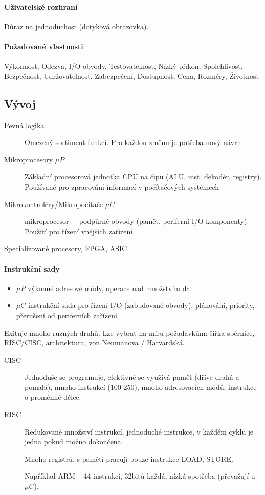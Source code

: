 \documentclass[a4paper, 11pt]{report}
\begin{document}
\paragraph{Uživatelské rozhraní}
Důraz na jednoduchost (dotyková obrazovka).

\paragraph{Požadované vlastnosti}
Výkonnost,  Odezva,  I/O obvody,  Testovatelnost,  Nízký příkon,  Spolehlivost,  Bezpečnost,  Udržovatelnost,  Zabezpečení,  Dostupnost,  Cena,  Rozměry,  Životnost

\subsection{Vývoj}
\begin{description}
	\item[Pevná logika] Omezený sortiment funkcí. Pro každou změnu je potřeba nový návrh
	\item[Mikroprocesory $\mu P$] Základní procesorová jednotka CPU na čipu (ALU, inst. dekodér, registry). Používané pro zpracování informací v počítačových systémech
	\item[Mikrokontroléry/Mikropočítače $\mu C$] mikroprocesor + podpůrné obvody (paměť, periferní I/O komponenty). Použití pro řízení vnějších zařízení.
	\item[Specializované procesory, FPGA, ASIC] 
\end{description}

\paragraph{Instrukční sady}
\begin{itemize}
	\item $\mu P$ výkonné adresové módy, operace nad množstvím dat
	\item $\mu C$ instrukční sada pro řízení I/O (zabudované obvody), plánování, priority, přerušení od periferních zařízení
\end{itemize}

Exituje mnoho různých druhů. Lze vybrat na míru požadavkům: šířka sběrnice, RISC/CISC, architektura, von Neumanova / Harvardská.

\begin{description}
	\item[CISC] Jednoduše se programuje, efektivně se využívá paměť (dříve drahá a pomalá), mnoho instrukcí (100-250), mnoho adresovacích módů, instrukce o proměnné délce.
	\item[RISC] Redukované množství instrukcí, jednoduché instrukce, v každém cyklu je jedna pokud možno dokončena.
	
	Mnoho registrů, s pamětí pracují pouze instrukce LOAD, STORE.
	
	Například ARM -- 44 instrukcí, 32bitů každá, nízká spotřeba (převažují u $\mu C$).
\end{description}
\end{document}
